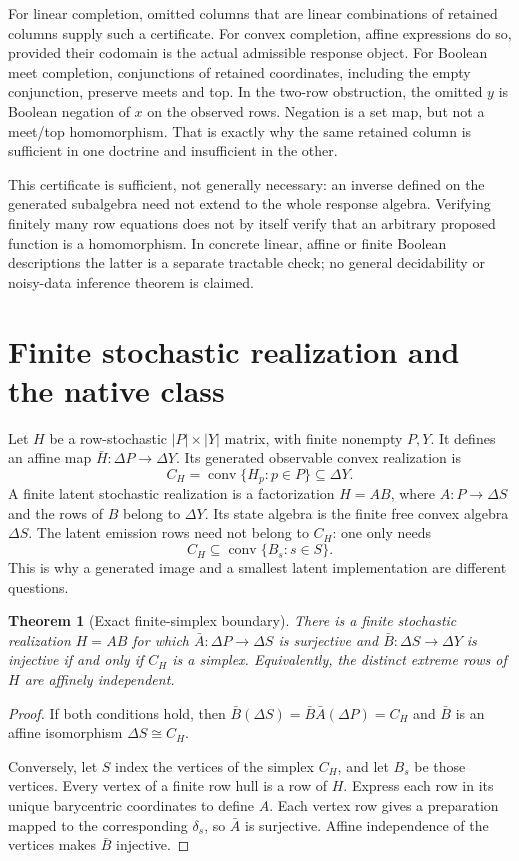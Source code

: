 \documentclass[11pt]{article}
\newtheorem{theorem}{Theorem}[section]
\DeclareMathOperator{\conv}{conv}
\begin{document}
For linear completion, omitted columns that are linear combinations of retained columns supply such a certificate. For convex completion, affine expressions do so, provided their codomain is the actual admissible response object. For Boolean meet completion, conjunctions of retained coordinates, including the empty conjunction, preserve meets and top. In the two-row obstruction, the omitted $y$ is Boolean negation of $x$ on the observed rows. Negation is a set map, but not a meet/top homomorphism. That is exactly why the same retained column is sufficient in one doctrine and insufficient in the other.

This certificate is sufficient, not generally necessary: an inverse defined on the generated subalgebra need not extend to the whole response algebra. Verifying finitely many row equations does not by itself verify that an arbitrary proposed function is a homomorphism. In concrete linear, affine or finite Boolean descriptions the latter is a separate tractable check; no general decidability or noisy-data inference theorem is claimed.

\section{Finite stochastic realization and the native class}
\label{sec:stochastic}

Let $H$ be a row-stochastic $|P|\times |Y|$ matrix, with finite nonempty $P,Y$. It defines an affine map $\bar H:\Delta P\to\Delta Y$. Its generated observable convex realization is
\[
 C_H=\conv\{H_p:p\in P\}\subseteq\Delta Y.
\]
A finite latent stochastic realization is a factorization $H=AB$, where $A:P\to\Delta S$ and the rows of $B$ belong to $\Delta Y$. Its state algebra is the finite free convex algebra $\Delta S$. The latent emission rows need not belong to $C_H$: one only needs
\[
 C_H\subseteq\conv\{B_s:s\in S\}.
\]
This is why a generated image and a smallest latent implementation are different questions.

\begin{theorem}[Exact finite-simplex boundary]
There is a finite stochastic realization $H=AB$ for which $\bar A:\Delta P\to\Delta S$ is surjective and $\bar B:\Delta S\to\Delta Y$ is injective if and only if $C_H$ is a simplex. Equivalently, the distinct extreme rows of $H$ are affinely independent.
\end{theorem}
\begin{proof}
If both conditions hold, then $\bar B(\Delta S)=\bar B\bar A(\Delta P)=C_H$ and $\bar B$ is an affine isomorphism $\Delta S\cong C_H$.

Conversely, let $S$ index the vertices of the simplex $C_H$, and let $B_s$ be those vertices. Every vertex of a finite row hull is a row of $H$. Express each row in its unique barycentric coordinates to define $A$. Each vertex row gives a preparation mapped to the corresponding $\delta_s$, so $\bar A$ is surjective. Affine independence of the vertices makes $\bar B$ injective.
\end{proof}
\end{document}
